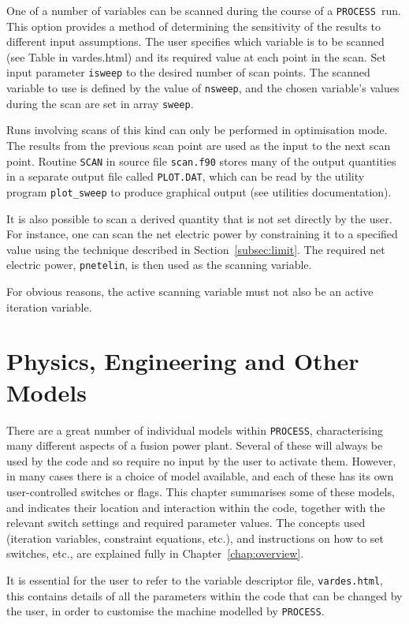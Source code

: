 \documentclass[11pt,a4paper]{report}
\newcommand{\plotdat}{\mbox{\texttt{PLOT.DAT}}}
\newcommand{\process}{\mbox{\texttt{PROCESS}}}
\newcommand{\setheader}[1]
 {\markright{\rlap{\lower0.8ex\hbox to\textwidth{\hrulefill}}{\bf#1}}}
\newcommand{\mychapter}[1]{\small\normalsize
 \setcounter{footnote}{0}
 \chapter{#1}
 \pagestyle{myheadings}
 \setheader{Chapter \thechapter\hspace{0.8em}#1}}
\begin{document}
One of a number of variables can be scanned during the course of a \process\
run.  This option provides a method of determining the sensitivity of the
results to different input assumptions. The user specifies which variable is
to be scanned (see Table in vardes.html) and its required value at each point
in the scan. Set input parameter \texttt{isweep} to the desired number of scan
points. The scanned variable to use is defined by the value of
\texttt{nsweep}, and the chosen variable's values during the scan are set in
array \texttt{sweep}.

Runs involving scans of this kind can only be performed in optimisation mode.
The results from the previous scan point are used as the input to the next
scan point. Routine \texttt{SCAN} in source file \texttt{scan.f90} stores many
of the output quantities in a separate output file called \plotdat, which can
be read by the utility program \texttt{plot\_sweep} to produce graphical
output (see utilities documentation).

It is also possible to scan a derived quantity that is not set directly by the user. For instance, one can scan the net electric power by constraining it to a specified value using the technique described in Section~\ref{subsec:limit}.  The required net electric power, \texttt{pnetelin}, is then used as the scanning variable.

For obvious reasons, the active scanning variable must not also be an active
iteration variable.



\mychapter{Physics, Engineering and Other Models}
\label{chap:models}

There are a great number of individual models within \process, characterising
many different aspects of a fusion power plant. Several of these will always
be used by the code and so require no input by the user to activate them.
However, in many cases there is a choice of model available, and each of these
has its own user-controlled switches or flags. This chapter summarises some of these
models, and indicates their location and interaction within the code, together
with the relevant switch settings and required parameter values. The concepts
used (iteration variables, constraint equations, etc.), and instructions on
how to set switches, etc., are explained fully in Chapter~\ref{chap:overview}.

It is essential for the user to refer to the variable descriptor file,
\texttt{vardes.html}, this contains details of all the parameters within the code that can be changed by the user, in order to customise the machine modelled by \process.
\end{document}
